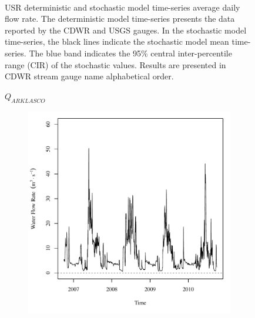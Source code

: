 \begin{landscape}
\begin{figure}
\begin{subfigure}{0.7\textwidth}
		\end{subfigure}\\
		\caption[USR deterministic and stochastic model time-series average daily flow rate.]{USR deterministic and stochastic model time-series average daily flow rate.  The deterministic model time-series presents the data reported by the CDWR and USGS gauges.  In the stochastic model time-series, the black lines indicate the stochastic model mean time-series.  The blue band indicates the 95\% central inter-percentile range (CIR) of the stochastic values.  Results are presented in CDWR stream gauge name alphabetical order.}
		\label{fig:GaugeFlow_US}
	\end{figure}
\end{landscape}
\subfiguremid
\begin{landscape}
	\begin{figure}
		\centering
		$ Q_{ARKLASCO} $
		\begin{subfigure}{0.7\textwidth}
			\centering
			\includegraphics[width=\tableCustomSize]{"Figures/Results_USR/Deterministic/Q U201"}
		\end{subfigure}%
		\begin{subfigure}{0.7\textwidth}
			\centering

\end{subfigure}
\end{figure}
\end{landscape}

